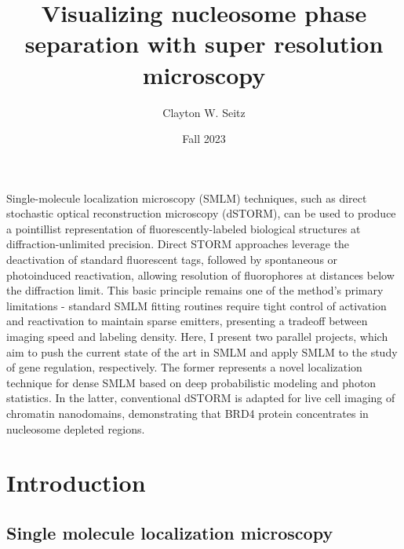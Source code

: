 \documentclass{ucetd}
\title{Visualizing nucleosome phase separation with super resolution microscopy}
\author{Clayton W. Seitz}
\date{Fall 2023}
\begin{document}
\maketitle



\tableofcontents


\abstract

Single-molecule localization microscopy (SMLM) techniques, such as direct stochastic optical reconstruction microscopy (dSTORM), can be used to produce a pointillist representation of fluorescently-labeled biological structures at diffraction-unlimited precision. Direct STORM approaches leverage the deactivation of standard fluorescent tags, followed by spontaneous or photoinduced reactivation, allowing resolution of fluorophores at distances below the diffraction limit. This basic principle remains one of the method's primary limitations - standard SMLM fitting routines require tight control of activation and reactivation to maintain sparse emitters, presenting a tradeoff between imaging speed and labeling density. Here, I present two parallel projects, which aim to push the current state of the art in SMLM and apply SMLM to the study of gene regulation, respectively. The former represents a novel localization technique for dense SMLM based on deep probabilistic modeling and photon statistics. In the latter, conventional dSTORM is adapted for live cell imaging of chromatin nanodomains, demonstrating that BRD4 protein concentrates in nucleosome depleted regions.

\clearpage

\mainmatter



\section{Introduction}

\subsection{Single molecule localization microscopy}
\end{document}
